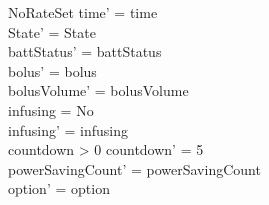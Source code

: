 \begin{schema}{NoRateSet}
	time' = time\\ State' = State\\
	\pagebreak
	battStatus' = battStatus\\
	bolus' = bolus\\
	bolusVolume' = bolusVolume\\
	infusing = No\\
	infusing' = infusing\\
	countdown > 0 \land countdown' = 5\\
	powerSavingCount' = powerSavingCount\\ option' = option\\
\end{schema}

